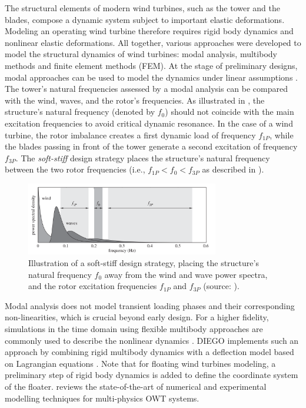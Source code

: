 The structural elements of modern wind turbines, such as the tower and the blades, compose a dynamic system subject to important elastic deformations. 
Modeling an operating wind turbine therefore requires rigid body dynamics and nonlinear elastic deformations. 
All together, various approaches were developed to model the structural dynamics of wind turbines: modal analysis, multibody methods and finite element methods (FEM). 
At the stage of preliminary designs, modal approaches can be used to model the dynamics under linear assumptions \citep{hegseth_2019_modal_FOWT}. 
The tower's natural frequencies assessed by a modal analysis can be compared with the wind, waves, and the rotor's frequencies. 
As illustrated in , the structure's natural frequency (denoted by $f_0$) should not coincide with the main excitation frequencies to avoid critical dynamic resonance.
In the case of a wind turbine, the rotor imbalance creates a first dynamic load of frequency $f_{1P}$, while the blades passing in front of the tower generate a second excitation of frequency $f_{3P}$.  
The \textit{soft-stiff} design strategy places the structure's natural frequency between the two rotor frequencies (i.e., $f_{1P} < f_0 < f_{3P}$ as described in ). 
\begin{figure}
    \centering
    \includegraphics[width=0.75\textwidth]{./part1/figures/modal_analysis.png}
    \caption{Illustration of a soft-stiff design strategy, placing the structure's natural frequency $f_0$ away from the wind and wave power spectra, and the rotor excitation frequencies $f_{1P}$ and $f_{3P}$ (source: \citet{kallehave_2015_modal}).}
    \label{fig:modal_analysis}
\end{figure}

Modal analysis does not model transient loading phases and their corresponding non-linearities, which is crucial beyond early design. 
For a higher fidelity, simulations in the time domain using flexible multibody approaches are commonly used to describe the nonlinear dynamics \citep{holm_2009_multibody,alsolihat_2018_flexible_multibody}.
DIEGO implements such an approach by combining rigid multibody dynamics with a deflection model based on Lagrangian equations \citep{milano_thesis_2021}. 
Note that for floating wind turbines modeling, a preliminary step of rigid body dynamics is added to define the coordinate system of the floater. 
\citet{otter_2022_owt_modeling_review} reviews the state-of-the-art of numerical and experimental modelling techniques for multi-physics OWT systems.


